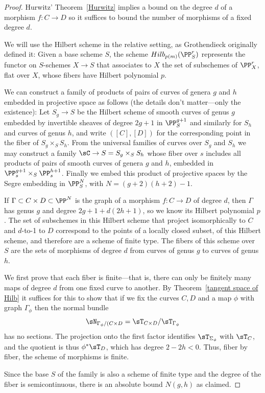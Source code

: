  \begin{proof}
 Hurwitz' Theorem~\ref{Hurwitz} implies a bound on the degree $d$ of a morphism $f : C \to D$ so it suffices to 
 bound the number of morphisms of a fixed degree $d$.
 
 We will use the Hilbert scheme in the relative setting, as Grothendieck originally defined it: Given a base scheme $S$,
the scheme $Hilb_{p(m)}(\PP_{S}^{r})$ represents the functor on $S$-schemes $X\to S$ that associates to 
$X$ the set of subschemes of $\PP_{X}^{r}$, flat over $X$, whose fibers have Hilbert polynomial $p$.

We can construct a family of products of pairs of curves of genera $g$ and $h$ embedded in projective space as follows
(the details don't matter---only the existence):
Let $S_{g}\to S$ be the Hilbert scheme of smooth curves of genus $g$ embedded by invertible sheaves of degree $2g+1$
in $\PP^{g+1}_{S}$
and similarly for $S_{h}$ and curves of genus $h$, and write $([C],[D])$ for the corresponding point in the fiber
of $S_{g}\times_{S}S_{h}$. From the universal families of curves over $S_{g}$ and
$S_{h}$ we may construct a family $\sC \to S= S_{g}\times_{S} S_{h}$ whose fiber over $s$ includes all products of 
pairs of smooth curves of genera $g$ and $h$, embedded in $\PP_{s}^{g+1}\times_{S}\PP_{s}^{h+1}$. Finally we embed
this product of projective spaces by the Segre embedding in $\PP_{S}^{N}$, with $N = (g+2)(h+2)-1$. 

If $\Gamma \subset C \times D \subset \PP^N$ is the graph of a morphism $f : C \to D$ of degree $d$, then $\Gamma$ has genus $g$ and degree $2g+1 + d(2h+1)$, so we know its Hilbert polynomial $p$. The set of
subschemes in this Hilbert scheme that project isomorphically to $C$ and $d$-to-1 to $D$ correspond to the
points of a  locally closed subset, of this Hilbert scheme, and therefore are a scheme of finite type. The fibers
of this scheme over $S$ are the sets of morphisms of degree $d$ from curves of genus $g$ to curves of genus $h$.

We first prove that each fiber is finite---that is, there can only be finitely many maps of degree $d$ from
one fixed curve to another.  By Theorem~\ref{tangent space of Hilb} it suffices for this to show that if we fix the curves $C,D$ and a map $\phi$
with graph $\Gamma_{\phi}$
then the normal bundle 
$$
\sN_{\Gamma_{\phi}/(C\times D} = \sT_{C\times D}/\sT_{\Gamma_{\phi}}
$$
has no sections. The projection onto the first factor identifies $\sT_{\Sigma_{\phi}}$ with $\sT_{C}$,
and the quotient is thus $\phi^{*} \sT_{D}$, which has degree $2-2h<0$. Thus, fiber by fiber,
the scheme of morphisms is finite. 

Since the base $S$ of the family is also a scheme of finite type and the degree of the fiber is semicontinuous,
there is an absolute bound $N(g,h)$ as claimed.
 \end{proof}

